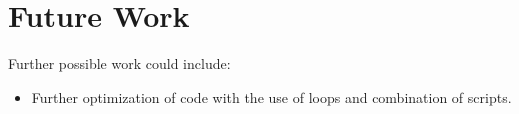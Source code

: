 \documentclass[report.tex]{subfiles}
\begin{document}
\section{Future Work}
Further possible work could include:

\begin{itemize}
  \item Further optimization of code with the use of loops and combination of scripts.
\end{itemize}
\end{document}
